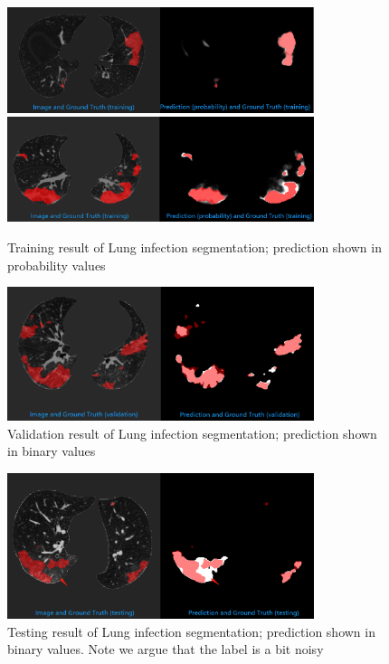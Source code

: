 \begin{figure}[h]
	\centering
	\includegraphics[width=0.8\textwidth]{img/experiment/Lung_result_train}
	\includegraphics[width=0.8\textwidth]{img/experiment/Lung_result_train2}
	\caption{Training result of Lung infection segmentation; prediction shown in probability values}
	\label{fig:full_sup_lung_result}
\end{figure}

\begin{figure}[h]
	\centering
	\includegraphics[width=0.8\textwidth]{img/experiment/Lung_result_val}
	\caption{Validation result of Lung infection segmentation; prediction shown in binary values}
	\label{fig:full_sup_lung_result}
\end{figure}

\begin{figure}[h]
	\centering
	\includegraphics[width=0.8\textwidth]{img/experiment/Lung_result_test}
	\caption{Testing result of Lung infection segmentation; prediction shown in binary values. Note we argue that the label is a bit noisy}
	\label{fig:full_sup_lung_result}
\end{figure}


